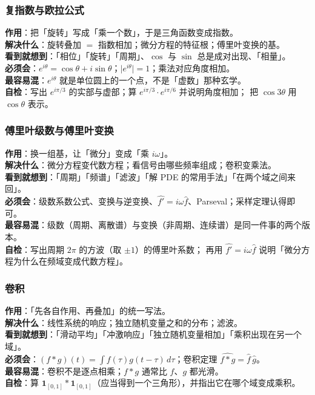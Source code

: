 \subsubsection*{复指数与欧拉公式}
\textbf{作用}：把「旋转」写成「乘一个数」，于是三角函数变成指数。\\
\textbf{解决什么}：旋转叠加 $=$ 指数相加；微分方程的特征根；傅里叶变换的基。\\
\textbf{看到就想到}：「相位」「旋转」「周期」、$\cos$ 与 $\sin$ 总是成对出现、「相量」。\\
\textbf{必须会}：$e^{i\theta}=\cos\theta+i\sin\theta$；$\lvert e^{i\theta}\rvert=1$；乘法对应角度相加。\\
\textbf{最容易混}：$e^{i\theta}$ 就是单位圆上的一个点，不是「虚数」那种玄学。\\
\textbf{自检}：写出 $e^{i\pi/3}$ 的实部与虚部；算 $e^{i\pi/3}\cdot e^{i\pi/6}$ 并说明角度相加；
把 $\cos3\theta$ 用 $\cos\theta$ 表示。

\subsubsection*{傅里叶级数与傅里叶变换}
\textbf{作用}：换一组基，让「微分」变成「乘 $i\omega$」。\\
\textbf{解决什么}：微分方程变代数方程；看信号由哪些频率组成；卷积变乘法。\\
\textbf{看到就想到}：「周期」「频谱」「滤波」「解 PDE 的常用手法」「在两个域之间来回」。\\
\textbf{必须会}：级数系数公式、变换与逆变换、$\widehat{f'}=i\omega\hat f$、Parseval；采样定理认得即可。\\
\textbf{最容易混}：级数（周期、离散谱）与变换（非周期、连续谱）是同一件事的两个版本。\\
\textbf{自检}：写出周期 $2\pi$ 的方波（取 $\pm1$）的傅里叶系数；
再用 $\widehat{f'}=i\omega\hat f$ 说明「微分方程为什么在频域变成代数方程」。

\subsubsection*{卷积}
\textbf{作用}：「先各自作用、再叠加」的统一写法。\\
\textbf{解决什么}：线性系统的响应；独立随机变量之和的分布；滤波。\\
\textbf{看到就想到}：「滑动平均」「冲激响应」「独立随机变量相加」「乘积出现在另一个域」。\\
\textbf{必须会}：$(f*g)(t)=\int f(\tau)g(t-\tau)\,d\tau$；卷积定理 $\widehat{f*g}=\hat f\,\hat g$。\\
\textbf{最容易混}：卷积不是逐点相乘；$f*g$ 通常比 $f$、$g$ 都光滑。\\
\textbf{自检}：算 $\mathbf{1}_{[0,1]}*\mathbf{1}_{[0,1]}$（应当得到一个三角形），并指出它在哪个域变成乘积。

